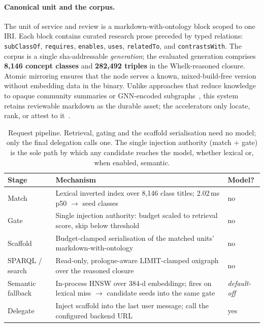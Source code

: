 \documentclass[10pt,twocolumn]{article}
\begin{document}
\paragraph{Canonical unit and the corpus.} The unit of service and review is a markdown-with-ontology block scoped to one IRI. Each block contains curated research prose preceded by typed relations: \texttt{subClassOf}, \texttt{requires}, \texttt{enables}, \texttt{uses}, \texttt{relatedTo}, and \texttt{contrastsWith}. The corpus is a single sha-addressable \emph{generation}; the evaluated generation comprises \textbf{8{,}146 concept classes} and \textbf{282{,}492 triples} in the Whelk-reasoned closure. Atomic mirroring ensures that the node serves a known, mixed-build-free version without embedding data in the binary. Unlike approaches that reduce knowledge to opaque community summaries or GNN-encoded subgraphs~\cite{edge2024graphrag,he2024gretriever}, this system retains reviewable markdown as the durable asset; the accelerators only locate, rank, or attest to it~\cite{garcez2023neurosymbolic}.

\begin{table}[t]\centering\small
\caption{Request pipeline. Retrieval, gating and the scaffold serialisation need no model; only
the final delegation calls one. The single injection authority (match $+$ gate) is the sole path by
which any candidate reaches the model, whether lexical or, when enabled, semantic.}
\label{tab:pipeline}
\renewcommand{\arraystretch}{1.15}
\begin{tabularx}{\textwidth}{@{}>{\raggedright\arraybackslash}p{2.7cm} >{\raggedright\arraybackslash}X >{\centering\arraybackslash}p{2.2cm}@{}}
\toprule
Stage & Mechanism & Model? \\
\midrule
Match & Lexical inverted index over 8{,}146 class titles; 2.02\,ms p50 $\to$ seed classes & no \\
Gate & Single injection authority: budget scaled to retrieval score, skip below threshold & no \\
Scaffold & Budget-clamped serialisation of the matched units' markdown-with-ontology & no \\
SPARQL / search & Read-only, prologue-aware LIMIT-clamped oxigraph over the reasoned closure & no \\
Semantic fallback & In-process HNSW over 384-d embeddings; fires on lexical miss $\to$ candidate seeds into the same gate & \emph{default-off} \\
Delegate & Inject scaffold into the last user message; call the configured backend URL & yes \\
\bottomrule
\end{tabularx}
\end{table}
\end{document}
